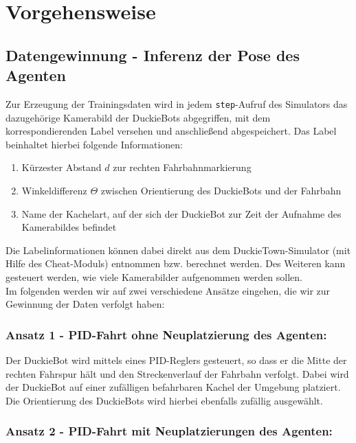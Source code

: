 
\chapter{Vorgehensweise}

\section{Datengewinnung - Inferenz der Pose des Agenten}
\label{collect-data}

Zur Erzeugung der Trainingsdaten wird in jedem \texttt{step}-Aufruf des Simulators das dazugehörige Kamerabild der DuckieBots abgegriffen, mit dem korrespondierenden Label versehen und anschließend abgespeichert. Das Label beinhaltet hierbei folgende Informationen:

\begin{enumerate}
	\item Kürzester Abstand $d$ zur rechten Fahrbahnmarkierung
	\item Winkeldifferenz $\Theta$ zwischen Orientierung des DuckieBots und der Fahrbahn
	\item Name der Kachelart, auf der sich der DuckieBot zur Zeit der Aufnahme des Kamerabildes befindet
\end{enumerate}

Die Labelinformationen können dabei direkt aus dem DuckieTown-Simulator (mit Hilfe des \glqq Cheat-Moduls\grqq) entnommen bzw. berechnet werden. Des Weiteren kann gesteuert werden, wie viele Kamerabilder aufgenommen werden sollen. \\

Im folgenden werden wir auf zwei verschiedene Ansätze eingehen, die wir zur Gewinnung der Daten verfolgt haben:

\subsection{Ansatz 1 - PID-Fahrt ohne Neuplatzierung des Agenten:}

Der DuckieBot wird mittels eines PID-Reglers gesteuert, so dass er die Mitte der rechten Fahrspur hält und den Streckenverlauf der Fahrbahn verfolgt. Dabei wird der DuckieBot auf einer zufälligen befahrbaren Kachel der Umgebung platziert. Die Orientierung des DuckieBots  wird hierbei ebenfalls zufällig ausgewählt.

\subsection{Ansatz 2 - PID-Fahrt mit Neuplatzierungen des Agenten:}


